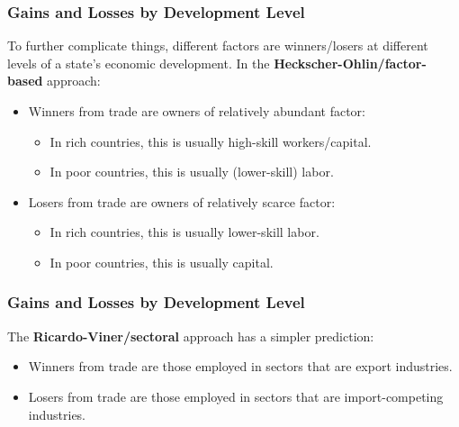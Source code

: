 \documentclass{beamer}
\begin{document}
\begin{frame} 
	\frametitle{\LARGE Gains and Losses by Development Level}
To further complicate things, different factors are winners/losers at different levels of a state's economic development. In the \textbf{Heckscher-Ohlin/factor-based} approach:
	\begin{itemize}
		\item Winners from trade are owners of relatively abundant factor: \pause 
		\begin{itemize}
			\item In rich countries, this is usually high-skill workers/capital.
			\item In poor countries, this is usually (lower-skill) labor. \pause
		\end{itemize}
		\item Losers from trade are owners of relatively scarce factor: \pause 
		\begin{itemize}
			\item In rich countries, this is usually lower-skill labor.
			\item In poor countries, this is usually capital. 
		\end{itemize} 
	\end{itemize}
\end{frame}

\begin{frame} 
	\frametitle{\LARGE Gains and Losses by Development Level}
	The \textbf{Ricardo-Viner/sectoral} approach has a simpler prediction:
	\begin{itemize}
		\item Winners from trade are those employed in sectors that are export industries. \pause 
		\item Losers from trade are those employed in sectors that are import-competing industries.
	\end{itemize}
\end{frame}
\end{document}
